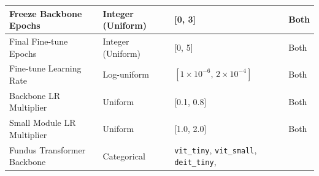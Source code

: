 \documentclass[preprint,12pt]{elsarticle}
\begin{document}
\begin{table}[!t]
\begin{tabular}{|p{}|p{}|p{}|p{}|}
        \hline
        Freeze Backbone Epochs                                                   &
        Integer (Uniform)                                                        &
        [0, 3]                                                                   &
        Both                                                                                                                                                           \\
        \hline
        Final Fine-tune Epochs                                                   &
        Integer (Uniform)                                                        &
        [0, 5]                                                                   &
        Both                                                                                                                                                           \\
        \hline
        Fine-tune Learning Rate                                                  &
        Log-uniform                                                              &
        $[1\times10^{-6},\,2\times10^{-4}]$                                      &
        Both                                                                                                                                                           \\
        \hline
        Backbone LR Multiplier                                                   &
        Uniform                                                                  &
        [0.1, 0.8]                                                               &
        Both                                                                                                                                                           \\
        \hline
        Small Module LR Multiplier                                               &
        Uniform                                                                  &
        [1.0, 2.0]                                                               &
        Both                                                                                                                                                           \\
        \hline
        Fundus Transformer Backbone                                              &
        Categorical                                                              &
        \makecell[l]{\texttt{vit\_tiny}, \texttt{vit\_small}, \texttt{deit\_tiny},                                                                                     \\
}
\end{tabular}
\end{table}
\end{document}
